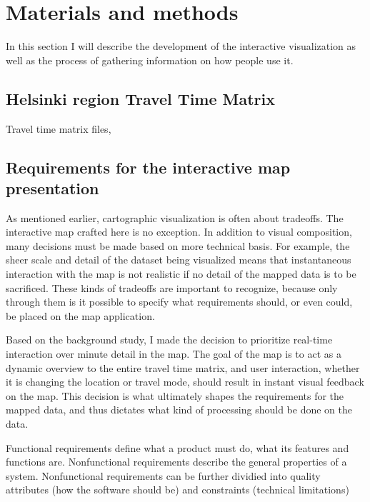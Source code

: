 \section{Materials and methods}
In this section I will describe the development of the interactive visualization
as well as the process of gathering information on how people use it.

\subsection{Helsinki region Travel Time Matrix}
Travel time matrix files,

\subsection{Requirements for the interactive map presentation}

As mentioned earlier, cartographic visualization is often about tradeoffs.
The interactive map crafted here is no exception.
In addition to visual composition,  %
many decisions must be made based on more technical basis.
For example, the sheer scale and detail of the dataset being visualized
means that instantaneous interaction with the map is not realistic
if no detail of the mapped data is to be sacrificed.
These kinds of tradeoffs are important to recognize,
because only through them is it possible to specify what
requirements should, or even could, be placed on the map application.

Based on the background study,  %
I made the decision to prioritize real-time interaction over minute detail in the map.
The goal of the map is to act as a dynamic overview to the entire travel time matrix,
and user interaction, whether it is changing the location or travel mode,
should result in instant visual feedback on the map.
This decision is what ultimately shapes the requirements for the mapped data,
and thus dictates what kind of processing should be done on the data.

Functional requirements define what a product must do,
what its features and functions are.
Nonfunctional requirements describe the general properties of a system.
Nonfunctional requirements can be further dividied into quality attributes
(how the software should be) and constraints (technical limitations)

